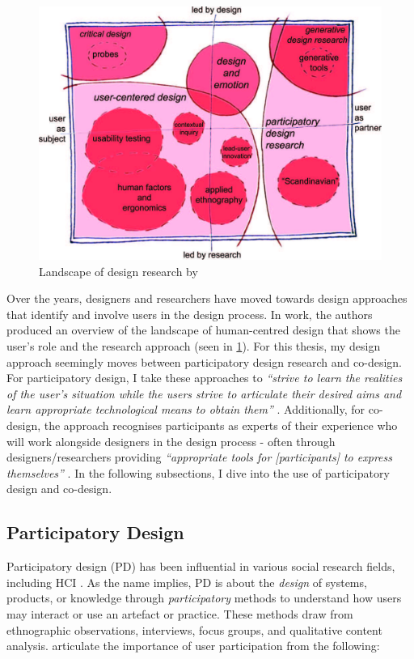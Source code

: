 \begin{figure}[htp]
    \centering
    \includegraphics[width=0.6\linewidth]{Images/Methodology/Landscape_of_Design.jpg}
    \caption{Landscape of design research by  \citep{sanders2008co}}
    \label{fig:LandscapeOfDesign}
\end{figure}

Over the years, designers and researchers have moved towards design approaches that identify and involve users in the design process. In \cite{sanders2008co} work, the authors produced an overview of the landscape of human-centred design that shows the user's role and the research approach (seen in \ref{fig:LandscapeOfDesign}). For this thesis, my design approach seemingly moves between participatory design research and co-design. For participatory design, I take these approaches to \textit{``strive to learn the realities of the user's situation while the users strive to articulate their desired aims and learn appropriate technological means to obtain them''} \citep{simonsen2013routledge}. Additionally, for co-design, the approach recognises participants as experts of their experience who will work alongside designers in the design process - often through designers/researchers providing \textit{``appropriate tools for [participants] to express themselves''} \citep{sanders2008co}. In the following subsections, I dive into the use of participatory design and co-design.

\subsection{Participatory Design}
\label{Method:PD}
Participatory design (PD) has been influential in various social research fields, including HCI \citep{bannon2018introduction}. As the name implies, PD is about the \textit{design} of systems, products, or knowledge through \textit{participatory} methods to understand how users may interact or use an artefact or practice. These methods draw from ethnographic observations, interviews, focus groups, and qualitative content analysis. \cite{carroll2007participatory} articulate the importance of user participation from the following:

